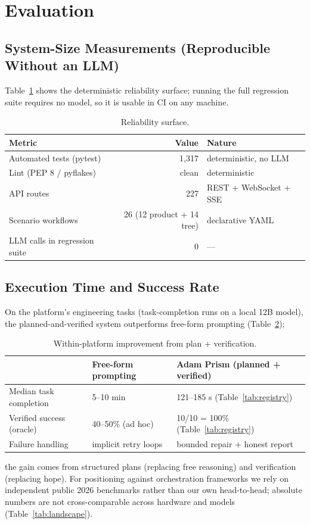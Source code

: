 \documentclass[11pt]{article}
\begin{document}
\section{Evaluation}\label{sec:eval}
\subsection{System-Size Measurements (Reproducible Without an LLM)}
Table~\ref{tab:size} shows the deterministic reliability surface; running the full
regression suite requires no model, so it is usable in CI on any machine.

\begin{table}[h!t]\centering
\caption{Reliability surface. \label{tab:size}}
\begin{tabular}{@{}lr l@{}}
\toprule
Metric & Value & Nature\\
\midrule
Automated tests (pytest) & 1{,}317 & deterministic, no LLM\\
Lint (PEP 8 / pyflakes) & clean & deterministic\\
API routes & 227 & REST + WebSocket + SSE\\
Scenario workflows & 26 (12 product + 14 tree) & declarative YAML\\
LLM calls in regression suite & 0 & ---\\
\bottomrule
\end{tabular}
\end{table}

\subsection{Execution Time and Success Rate}
On the platform's engineering tasks (task-completion runs on a local 12B model), the
planned-and-verified system outperforms free-form prompting (Table~\ref{tab:within});

\begin{table}[h!t]\centering
\caption{Within-platform improvement from plan + verification.
\label{tab:within}}
\begin{tabular}{@{}lll@{}}
\toprule
 & Free-form prompting & Adam Prism (planned + verified)\\
\midrule
Median task completion & 5--10 min & 121--185 s (Table~\ref{tab:registry})\\
Verified success (oracle) & 40--50\% (ad hoc) & 10/10 = 100\% (Table~\ref{tab:registry})\\
Failure handling & implicit retry loops & bounded repair + honest report\\
\bottomrule
\end{tabular}
\end{table}
the gain comes from structured plans (replacing free reasoning) and verification
(replacing hope). For positioning against orchestration frameworks we rely on independent
public 2026 benchmarks rather than our own head-to-head; absolute numbers are not
cross-comparable across hardware and models (Table~\ref{tab:landscape}).
\end{document}

